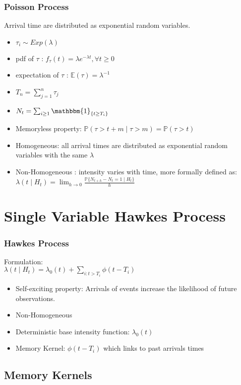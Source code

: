 \documentclass{beamer}
\begin{document}
\begin{frame}
\frametitle{Poisson Process}
Arrival time are distributed as exponential random variables.
\begin{itemize}
	\item $\tau_i \sim Exp(\lambda)$
	\item pdf of $\tau$ : $f_{\tau}(t) = \lambda e^{-\lambda t}, \forall t \ge 0$
	\item expectation of $\tau$ : $\mathbb{E}(\tau) = \lambda^{-1}$
	\item $T_n = \sum_{j=1}^n \tau_j$
	\item $N_t = \sum_{i \ge 1} \mathbbm{1}_{\{ t \ge T_i\}}$
	\item Memoryless property: $\mathbb{P}(\tau > t + m \mid \tau > m) = \mathbb{P}(\tau > t)$
	\item Homogeneous: all arrival times are distributed as exponential random variables with the same $\lambda$
	\item Non-Homogeneous : intensity varies with time, more formally defined as: $\lambda(t \mid H_t) = \lim_{h \to 0} \frac{\mathbb{P}\{ N_{t + h} - N_t = 1 \mid H_t\}}{h}$
\end{itemize}
\end{frame}

\section{Single Variable Hawkes Process}

\begin{frame}
\frametitle{Hawkes Process}
Formulation:\\
$\lambda(t \mid H_t) = \lambda_0(t) + \sum_{i: t > T_i} \phi(t - T_i)$
\begin{itemize}
	\item Self-exciting property: Arrivals of events increase the likelihood of future observations.
	\item Non-Homogeneous
	\item Deterministic base intensity function: $\lambda_0(t)$
	\item Memory Kernel: $\phi(t - T_i)$ which links to past arrivals times
\end{itemize}
\end{frame}

\subsection{Memory Kernels}
\end{document}
